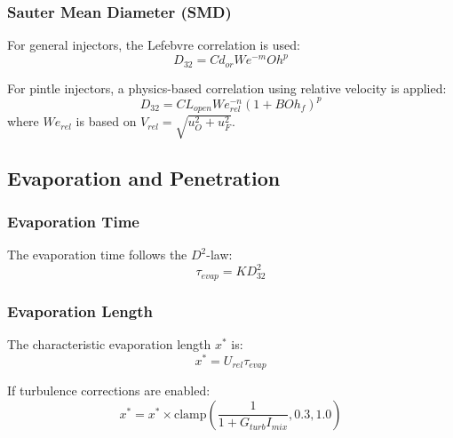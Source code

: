 \subsubsection{Sauter Mean Diameter (SMD)}
For general injectors, the Lefebvre correlation is used:
\begin{equation}
D_{32} = C d_{or} We^{-m} Oh^p
\end{equation}

For pintle injectors, a physics-based correlation using relative velocity is applied:
\begin{equation}
D_{32} = C L_{open} We_{rel}^{-n} (1 + B Oh_f)^p
\end{equation}
where \(We_{rel}\) is based on \(V_{rel} = \sqrt{u_O^2 + u_F^2}\).

\subsection{Evaporation and Penetration}

\subsubsection{Evaporation Time}
The evaporation time follows the \(D^2\)-law:
\begin{equation}
\tau_{evap} = K D_{32}^2
\end{equation}

\subsubsection{Evaporation Length}
The characteristic evaporation length \(x^*\) is:
\begin{equation}
x^* = U_{rel} \tau_{evap}
\end{equation}

If turbulence corrections are enabled:
\begin{equation}
x^* = x^* \times \text{clamp}\left(\frac{1}{1 + G_{turb} I_{mix}}, 0.3, 1.0\right)
\end{equation}

